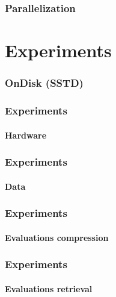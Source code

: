\documentclass{beamer}
\begin{document}
\begin{frame}
	\frametitle{Parallelization}
\end{frame}

\section{Experiments}

\begin{frame}
	\frametitle{OnDisk (SSTD)}
\end{frame}

\begin{frame}
	\frametitle{Experiments}
	\framesubtitle{Hardware}
\end{frame}

\begin{frame}
	\frametitle{Experiments}
	\framesubtitle{Data}
\end{frame}

\begin{frame}
	\frametitle{Experiments}
	\framesubtitle{Evaluations compression}
\end{frame}

\begin{frame}
	\frametitle{Experiments}
	\framesubtitle{Evaluations retrieval}
\end{frame}
\end{document}

